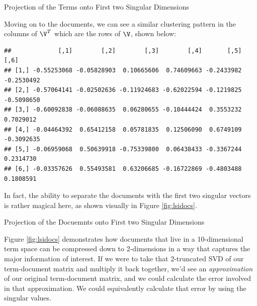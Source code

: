 \documentclass[
]{article}
\newenvironment{Shaded}{\begin{snugshade}}{\end{snugshade}}
\newcommand{\CommentTok}[1]{\textcolor[rgb]{0.56,0.35,0.01}{\textit{#1}}}
\newcommand{\DecValTok}[1]{\textcolor[rgb]{0.00,0.00,0.81}{#1}}
\newcommand{\FunctionTok}[1]{\textcolor[rgb]{0.00,0.00,0.00}{#1}}
\newcommand{\NormalTok}[1]{#1}
\newcommand{\OtherTok}[1]{\textcolor[rgb]{0.56,0.35,0.01}{#1}}
\newcommand{\SpecialCharTok}[1]{\textcolor[rgb]{0.00,0.00,0.00}{#1}}
\newcommand{\StringTok}[1]{\textcolor[rgb]{0.31,0.60,0.02}{#1}}
\theoremstyle{definition}
\theoremstyle{definition}
\theoremstyle{definition}
\theoremstyle{definition}
\theoremstyle{remark}
\begin{document}
\label{fig:lsiwords}Projection of the Terms onto First two Singular Dimensions

Moving on to the documents, we can see a similar clustering pattern in the columns of \(\V^T\) which are the rows of \(\V\), shown below:

\begin{Shaded}
\end{Shaded}

\begin{verbatim}
##             [,1]        [,2]        [,3]        [,4]       [,5]       [,6]
## [1,] -0.55253068 -0.05828903  0.10665606  0.74609663 -0.2433982 -0.2530492
## [2,] -0.57064141 -0.02502636 -0.11924683 -0.62022594 -0.1219825 -0.5098650
## [3,] -0.60092838 -0.06088635  0.06280655 -0.10444424  0.3553232  0.7029012
## [4,] -0.04464392  0.65412158  0.05781835  0.12506090  0.6749109 -0.3092635
## [5,] -0.06959068  0.50639918 -0.75339800  0.06438433 -0.3367244  0.2314730
## [6,] -0.03357626  0.55493581  0.63206685 -0.16722869 -0.4803488  0.1808591
\end{verbatim}

In fact, the ability to separate the documents with the first two singular vectors is rather magical here, as shown visually in Figure \ref{fig:lsidocs}.

\hypertarget{htmlwidget-5ae557a508338f008a12}{}

\label{fig:lsidocs}Projection of the Docuemnts onto First two Singular Dimensions

Figure \ref{fig:lsidocs} demonstrates how documents that live in a 10-dimensional term space can be compressed down to 2-dimensions in a way that captures the major information of interest. If we were to take that 2-truncated SVD of our term-document matrix and multiply it back together, we'd see an \emph{approximation} of our original term-document matrix, and we could calculate the error involved in that approximation. We could equivalently calculate that error by using the singular values.

\begin{Shaded}
\end{Shaded}
\end{document}
